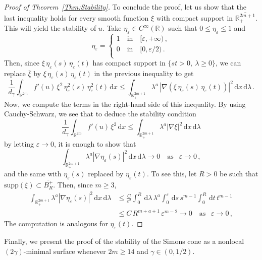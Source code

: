 \documentclass[twoside,leqno,symbols-for-thanks, draft]{rmi}
\numberwithin{equation}{section}
\theoremstyle{definition}
\newcommand{\con}[1]{\mathbb{#1}}
\newcommand{\R}{\con{R}} %
\newcommand{\s}{\gamma}
\renewcommand{\d}{\,\mathrm{d}} %
\begin{document}
\begin{proof}[Proof of Theorem~\ref{Thm:Stability}]
	
	To conclude the proof, let us show that the last inequality holds for every smooth function $\xi$ with compact support in $\overline{\R^{2m+1}_+}$. This will yield the stability of $u$. Take $\eta_\varepsilon\in C^\infty(\R)$ such that $0\leq \eta_\varepsilon \leq 1$ and
	$$ \eta_\varepsilon = \begin{cases}
	1 \ \ \ \text{ in } \ \ \ [\varepsilon, +\infty)\,,\\
	0 \ \ \ \text{ in } \ \ \ [0, \varepsilon/2)\,.\\
	\end{cases} $$
	Then, since $\xi\,\eta_\varepsilon(s)\,\eta_\varepsilon(t)$ has compact support in $\{st>0, \ \lambda \geq 0\}$, we can replace $\overline{\xi}$ by $\xi\,\eta_\varepsilon(s)\,\eta_\varepsilon(t)$ in the previous inequality to get
	$$
	\frac{1}{d_\s}\int_{\R^{2m}} f'(u)\,\xi^2\,\eta_\varepsilon^2(s)\,\eta_\varepsilon^2(t) \d x \leq \int_{\R^{2m+1}_+} \lambda^a\,|\nabla (\xi\,\eta_\varepsilon(s)\,\eta_\varepsilon(t))|^2 \d x \d \lambda\,. $$
	Now, we compute the terms in the right-hand side of this inequality. By using Cauchy-Schwarz, we see that to deduce the stability condition 
	$$
	\frac{1}{d_\s}\int_{\R^{2m}} f'(u)\,\xi^2 \d x  
	\leq \int_{\R^{2m+1}_+} \lambda^a |\nabla \xi|^2  \d x \d \lambda
	$$
	by letting $\varepsilon \to 0$, it is enough to show that
	$$ \int_{\R^{2m+1}_+} \lambda^a|\nabla\eta_\varepsilon(s)|^2 \d x \d \lambda  \to 0 \ \ \ \text{ as } \ \ \varepsilon \to 0\,,$$
	and the same with $\eta_\varepsilon(s)$ replaced by $\eta_\varepsilon(t)$. To see this, let $R>0$ be such that $\text{supp}(\xi)\subset \overline{B_R^+}$. Then, since $m\geq 3$,
	\begin{align*}
	\int_{\R^{2m+1}_+} \lambda^a|\nabla\eta_\varepsilon(s)|^2 \d x \d \lambda &\leq \frac{C}{\varepsilon^2} \int_0^R \d \lambda \, \lambda^a \int_0^\varepsilon \d s \, s^{m-1} \int_0^R \d t \,t^{m-1} \\
	&\leq C\,R^{m+a+1}\,\varepsilon^{m-2} \to 0 \ \ \ \text{ as } \ \ \varepsilon \to 0\,,
	\end{align*}
	The computation is analogous for $\eta_\varepsilon(t)$.
\end{proof}

Finally, we present the proof of the stability of the Simons cone as a nonlocal $(2\s)$-minimal surface whenever $2m\geq 14$ and $\s\in(0,1/2)$.
\end{document}
